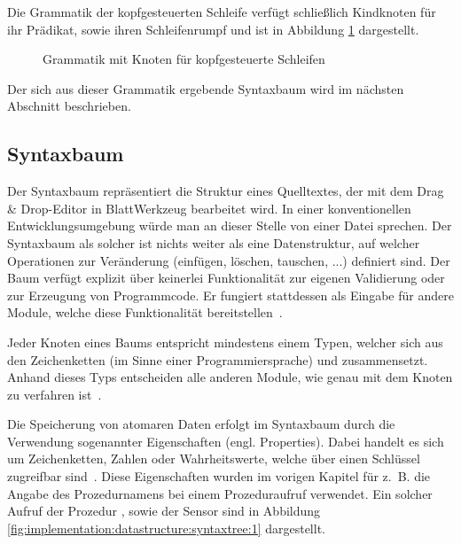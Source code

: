 Die Grammatik der kopfgesteuerten Schleife verfügt schließlich Kindknoten für ihr Prädikat, sowie ihren Schleifenrumpf und ist in Abbildung \ref{fig:implementation:datastructure:grammar:8} dargestellt.

\begin{figure}[h]
  
  \caption{Grammatik mit Knoten für kopfgesteuerte Schleifen}
  \label{fig:implementation:datastructure:grammar:8}
\end{figure}

Der sich aus dieser Grammatik ergebende Syntaxbaum wird im nächsten Abschnitt beschrieben.

\subsection{Syntaxbaum}
\label{sec:implementation:datastructure:syntaxtree}

Der Syntaxbaum repräsentiert die Struktur eines Quelltextes, der mit dem Drag \& Drop-Editor in BlattWerkzeug bearbeitet wird. In einer konventionellen Entwicklungsumgebung würde man an dieser Stelle von einer Datei sprechen. Der Syntaxbaum als solcher ist nichts weiter als eine Datenstruktur, auf welcher Operationen zur Veränderung (einfügen, löschen, tauschen, ...) definiert sind. Der Baum verfügt explizit über keinerlei Funktionalität zur eigenen Validierung oder zur Erzeugung von Programmcode. Er fungiert stattdessen als Eingabe für andere Module, welche diese Funktionalität bereitstellen~\cite[3]{riemer2018}.

Jeder Knoten eines Baums entspricht mindestens einem Typen, welcher sich aus den Zeichenketten  (im Sinne einer Programmiersprache) und  zusammensetzt. Anhand dieses Typs entscheiden alle anderen Module, wie genau mit dem Knoten zu verfahren ist~\cite[4]{riemer2018}.

Die Speicherung von atomaren Daten erfolgt im Syntaxbaum durch die Verwendung sogenannter Eigenschaften (engl. Properties). Dabei handelt es sich um Zeichenketten, Zahlen oder Wahrheitswerte, welche über einen Schlüssel zugreifbar sind~\cite[4]{riemer2018}. Diese Eigenschaften wurden im vorigen Kapitel für z.~B. die Angabe des Prozedurnamens bei einem Prozeduraufruf verwendet. Ein solcher Aufruf der Prozedur , sowie der Sensor  sind in Abbildung \ref{fig:implementation:datastructure:syntaxtree:1} dargestellt.

